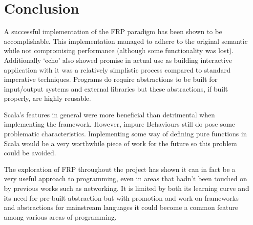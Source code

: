 \chapter{Conclusion}

A successful implementation of the FRP paradigm has been shown to be accomplishable. This implementation
managed to adhere to the original semantic while not compromising performance (although some functionality was
lost). Additionally `echo' also showed promise in actual use as building interactive application with it
was a relatively simplistic process compared to standard imperative techniques. Programs do require abstractions
to be built for input/output systems and external libraries but these abstractions, if built properly, are highly
reusable.

Scala's features in general were more beneficial than detrimental when implementing the framework. However,
impure Behaviours still do pose some problematic characteristics. Implementing some way of defining pure functions
in Scala would be a very worthwhile piece of work for the future so this problem could be avoided.

The exploration of FRP throughout the project has shown it can in fact be a very useful approach to programming,
even in areas that hadn't been touched on by previous works such as networking. It is limited by
both its learning curve and its need for pre-built abstraction but with promotion and work on frameworks
and abstractions for mainstream languages it could become a common feature among various areas of programming.